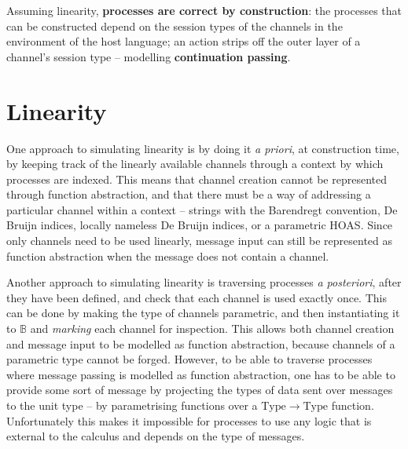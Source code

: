 \documentclass{mproj}
\begin{document}
\cite{Vasconcelos2010}


Assuming linearity, \textbf{processes are correct by construction}: the
processes that can be constructed depend on the session types of the channels in
the environment of the host language; an action strips off the outer layer of a
channel's session type -- modelling \textbf{continuation passing}.

\section{Linearity}\label{linearity}

\cite{Kobayashi1999}
\cite{Toninho2011}

One approach to simulating linearity is by doing it \textit{a priori}, at
construction time, by keeping track of the linearly available channels through a
context by which processes are indexed. This means that channel creation cannot
be represented through function abstraction, and that there must be a way of
addressing a particular channel within a context -- strings with the Barendregt
convention, De Bruijn indices, locally nameless De Bruijn indices, or a
parametric HOAS. Since only channels need to be used linearly, message input can
still be represented as function abstraction when the message does not contain a
channel. 

Another approach to simulating linearity is traversing processes \textit{a
posteriori}, after they have been defined, and check that each channel is used
exactly once. This can be done by making the type of channels parametric, and
then instantiating it to $\mathbb{B}$ and \textit{marking} each channel for
inspection. This allows both channel creation and message input to be modelled
as function abstraction, because channels of a parametric type cannot be forged.
However, to be able to traverse processes where message passing is modelled as
function abstraction, one has to be able to provide some sort of message by
projecting the types of data sent over messages to the unit type -- by
parametrising functions over a $\mathrm{Type} \rightarrow \mathrm{Type}$
function. Unfortunately this makes it impossible for processes to use any logic
that is external to the calculus and depends on the type of messages. 
\end{document}
